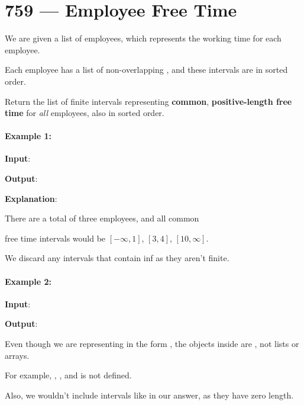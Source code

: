 \section{759 --- Employee Free Time}
We are given a list  of employees, which represents the working time for each employee.

Each employee has a list of non-overlapping , and these intervals are in sorted order.

Return the list of finite intervals representing \textbf{common}, \textbf{positive-length free time} for \textit{all} employees, also in sorted order.

\paragraph{Example 1:}

\begin{flushleft}
\textbf{Input}: 

\textbf{Output}: \fcj{[[3,4]]}

\textbf{Explanation}:

There are a total of three employees, and all common

free time intervals would be $[-\infty, 1]$, $[3, 4]$, $[10, \infty]$.

We discard any intervals that contain inf as they aren't finite.
\end{flushleft}

 

\paragraph{Example 2:}

\begin{flushleft}
\textbf{Input}: 

\textbf{Output}: \fcj{[[5,6],[7,9]]}
\end{flushleft}

 
Even though we are representing  in the form \fcj{[x, y]}, the objects inside are , not lists or arrays. 

For example, , , and  is not defined.


Also, we wouldn't include intervals like \fcj{[5, 5]} in our answer, as they have zero length.

